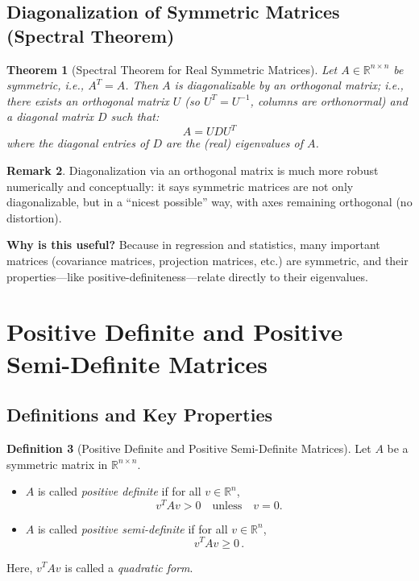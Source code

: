 \documentclass[11pt]{article}
\theoremstyle{definition}
\newtheorem{definition}{Definition}[section]
\theoremstyle{plain}
\newtheorem{theorem}[definition]{Theorem}
\theoremstyle{definition}
\newtheorem{remark}[definition]{Remark}
\begin{document}
\subsection{Diagonalization of Symmetric Matrices (Spectral Theorem)}

\begin{theorem}[Spectral Theorem for Real Symmetric Matrices]
Let $A \in \mathbb{R}^{n\times n}$ be symmetric, i.e., $A^T = A$. Then $A$ is diagonalizable by an orthogonal matrix; i.e., there exists an orthogonal matrix $U$ (so $U^T = U^{-1}$, columns are orthonormal) and a diagonal matrix $D$ such that:
\[
A = U D U^T
\]
where the diagonal entries of $D$ are the (real) eigenvalues of $A$.
\end{theorem}

\begin{remark}
Diagonalization via an orthogonal matrix is much more robust numerically and conceptually: it says symmetric matrices are not only diagonalizable, but in a ``nicest possible'' way, with axes remaining orthogonal (no distortion).
\end{remark}

\vspace{0.5em}
\noindent\textbf{Why is this useful?} Because in regression and statistics, many important matrices (covariance matrices, projection matrices, etc.) are symmetric, and their properties—like positive-definiteness—relate directly to their eigenvalues.

\section{Positive Definite and Positive Semi-Definite Matrices}

\subsection{Definitions and Key Properties}

\begin{definition}[Positive Definite and Positive Semi-Definite Matrices]
Let $A$ be a symmetric matrix in $\mathbb{R}^{n\times n}$.
\begin{itemize}
    \item $A$ is called \emph{positive definite} if for all $v \in \mathbb{R}^n$,
    \[
        v^T A v > 0 \quad\text{unless}\quad v = 0.
    \]
    \item $A$ is called \emph{positive semi-definite} if for all $v \in \mathbb{R}^n$,
    \[
        v^T A v \geq 0\,.
    \]
\end{itemize}
\end{definition}
Here, $v^T A v$ is called a \emph{quadratic form}.
\end{document}
